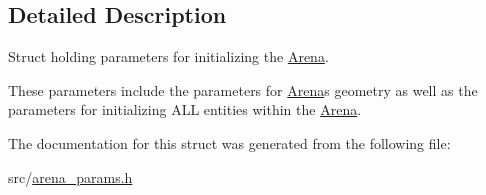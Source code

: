 \subsection{Detailed Description}
Struct holding parameters for initializing the \mbox{\hyperlink{class_arena}{Arena}}. 

These parameters include the parameters for \mbox{\hyperlink{class_arena}{Arena}}\textquotesingle{}s geometry as well as the parameters for initializing A\+LL entities within the \mbox{\hyperlink{class_arena}{Arena}}. 

The documentation for this struct was generated from the following file\+:\begin{DoxyCompactItemize}
\item 
src/\mbox{\hyperlink{arena__params_8h}{arena\+\_\+params.\+h}}\end{DoxyCompactItemize}

